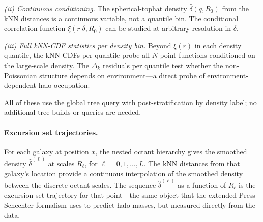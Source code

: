 \emph{(ii) Continuous conditioning.}  The spherical-tophat density $\hat\delta(q, R_0)$ from the kNN distances is a continuous variable, not a quantile bin.  The conditional correlation function $\xi(r|\delta, R_0)$ can be studied at arbitrary resolution in $\delta$.

\emph{(iii) Full kNN-CDF statistics per density bin.}  Beyond $\xi(r)$ in each density quantile, the kNN-CDFs per quantile probe all $N$-point functions conditioned on the large-scale density.  The $\Delta_k$ residuals per quantile test whether the non-Poissonian structure depends on environment---a direct probe of environment-dependent halo occupation.

All of these use the global tree query with post-stratification by density label; no additional tree builds or queries are needed.

\paragraph{Excursion set trajectories.}  For each galaxy at position $x$, the nested octant hierarchy gives the smoothed density $\hat\delta^{(\ell)}$ at scales $R_\ell$, for $\ell = 0, 1, \ldots, L$.  The kNN distances from that galaxy's location provide a continuous interpolation of the smoothed density between the discrete octant scales.  The sequence $\hat\delta^{(\ell)}$ as a function of $R_\ell$ is the excursion set trajectory for that point---the same object that the extended Press--Schechter formalism \citep{Bond1991} uses to predict halo masses, but measured directly from the data.
